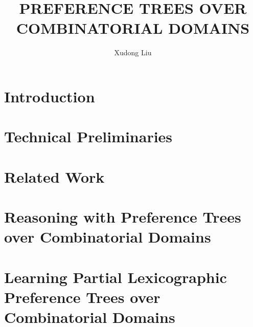 \documentclass[final]{ukthesis}
\begin{document}
\author{Xudong Liu}
\title{PREFERENCE TREES OVER COMBINATORIAL DOMAINS}
\abstract{}
\frontmatter
\maketitle
\begin{acknowledgments}
	
\end{acknowledgments}
\begin{dedication}
	
\end{dedication}
\tableofcontents\clearpage
\listoffigures\clearpage
\listoftables\clearpage
\mainmatter

\chapter{Introduction}

\copyrightnotice

\chapter{Technical Preliminaries}

\copyrightnotice

\chapter{Related Work}

\copyrightnotice

\chapter{Reasoning with Preference Trees over Combinatorial Domains}

\copyrightnotice

\chapter{Learning Partial Lexicographic Preference Trees over Combinatorial Domains}

\copyrightnotice
\end{document}
